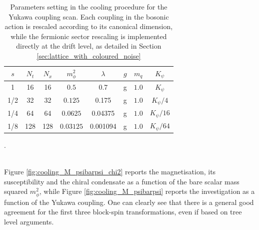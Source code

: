\begin{table}[htp]
    \centering
    \begin{tabular}{cccccccc}
        \toprule
        $s$ & $N_t$ & $N_x$ & $m_\phi^2$ & $\lambda$ & $g$ & $m_q$& $K_\psi$ \\
        \midrule 
        1 & 16 & 16 & $0.5$ & 0.7 & g & $1.0$ & $K_\psi$ \\
        1/2 & 32 & 32 & $0.125$ & 0.175 & g & $1.0$ & $K_\psi/4$ \\
        1/4 & 64 & 64 & $0.0625$ & 0.04375 & g & $1.0$ & $K_\psi/16$ \\
        1/8 & 128 & 128 & $0.03125$ & 0.001094 & g & $1.0$ & $K_\psi/64$ \\
        \bottomrule
    \end{tabular}
    \caption[Parameter settings in the cooling procedure for the Yukawa coupling scan.]{Parameters setting in the cooling procedure for the Yukawa coupling scan. Each coupling in the bosonic action is rescaled according to its canonical dimension, while the fermionic sector rescaling is implemented directly at the drift level, as detailed in Section \ref{sec:lattice_with_coloured_noise}}.
    \label{tab:params_cooling_yukawa}
\end{table} \\
Figure \ref{fig:cooling_M_psibarpsi_chi2} reports the magnetisation, its susceptibility and the chiral condensate as a function of the bare scalar mass squared $m_\phi^2$, while Figure \ref{fig:cooling_M_psibarpsi} reports the investigation as a function of the Yukawa coupling.
One can clearly see that there is a general good agreement for the first three block-spin transformations, even if based on tree level arguments.
